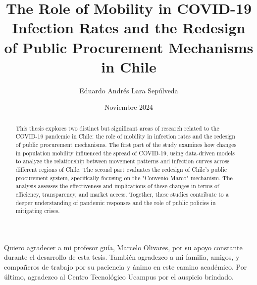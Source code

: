 \documentclass[upright, contnum]{umemoria}
\author{Eduardo Andrés Lara Sepúlveda}
\title{The Role of Mobility in COVID-19 Infection Rates and the Redesign of Public Procurement Mechanisms in Chile}
\date{Noviembre 2024}
\begin{document}
\frontmatter
\maketitle

\begin{abstract}
{This thesis explores two distinct but significant areas of research 
related to the COVID-19 pandemic in Chile: the role of mobility in 
infection rates and the redesign of public procurement mechanisms. 
The first part of the study examines how changes in population mobility 
influenced the spread of COVID-19, using data-driven models to analyze 
the relationship between movement patterns and infection curves across 
different regions of Chile. The second part evaluates the redesign of 
Chile's public procurement system, specifically focusing on the 
"Convenio Marco" mechanism. The analysis assesses the effectiveness 
and implications of these changes in terms of efficiency, transparency, 
and market access. Together, these studies contribute to a deeper 
understanding of pandemic responses and the role of public policies 
in mitigating crises.}
\end{abstract}

\begin{dedicatoria} %
\end{dedicatoria}

\begin{thanks} %
    \cambiarlinea{} Quiero agradecer a mi profesor guía, Marcelo Olivares, por su apoyo constante 
    durante el desarrollo de esta tesis. También agradezco a mi familia, amigos, 
    y compañeros de trabajo por su paciencia y ánimo en este camino académico. 
    Por último, agradezco al Centro Tecnológico Ucampus por el auspicio brindado.
    \end{thanks}
    
\cleardoublepage %

\tableofcontents
\listoftables %
\listoffigures %

\mainmatter %










\end{document}
